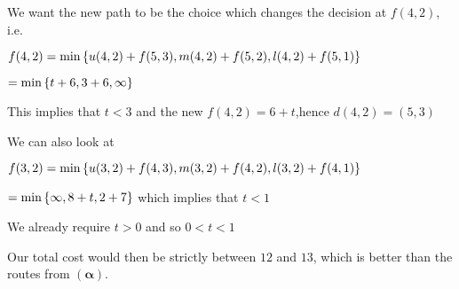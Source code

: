 \begin{prob}
\begin{enumerate}[label = {\textbf{(\greek*)}}]
        \begin{sol}
        We want the new path to be the choice which changes the decision at $f(4,2)$, i.e.
        
        $f(4,2)= \min\left\{ u(4,2)+f(5,3),m(4,2)+f(5,2),l(4,2)+f(5,1)\right\}$
        
        $= \min\left\{t+6,3+6,\infty\right\}$
        
        This implies that $t<3$ and the new $f(4,2)=6+t$,hence $d(4,2)=(5,3)$
        
        We can also look at 
        
        $f(3,2)= \min\left\{ u(3,2)+f(4,3),m(3,2)+f(4,2),l(3,2)+f(4,1)\right\}$
        
        $=\min\left\{\infty,8+t,2+7\right\}$ which implies that $t<1$
        
        We already require $t>0$ and so $0<t<1$
        
        Our total cost would then be strictly between $12$ and $13$, which is better than the routes from $\mathbf{(\alpha)}.$
        \end{sol}

    \end{enumerate}
\end{prob}

